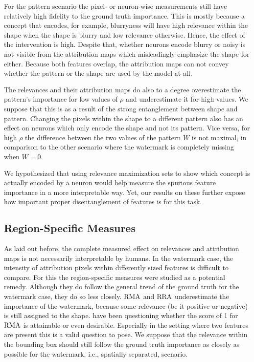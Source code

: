 For the pattern scenario the pixel- or neuron-wise measurements still have relatively high fidelity to the ground truth importance. 
This is mostly because a concept that encodes, for example, blurryness will have high relevance within the shape when the shape is blurry and low relevance otherwise. Hence, the effect of the intervention is high. Despite that, whether neurons encode blurry or noisy is not visible from the attribution maps which misleadingly emphasize the shape for either. Because both features overlap, the attribution maps can not convey whether the pattern or the shape are used by the model at all.

The relevances and their attribution maps do also to a degree overestimate the pattern's importance for low values of $\rho$ and underestimate it for high values. We suppose that this is as a result of the strong entanglement between shape and pattern. Changing the pixels within the shape to a different pattern also has an effect on neurons which only encode the shape and not its pattern. Vice versa, for high $\rho$ the difference between the two values of the pattern $W$ is not maximal, in comparison to the other scenario where the watermark is completely missing when $W=0$. 

We hypothesized that using relevance maximization sets to show which concept is actually encoded by a neuron would help measure the spurious feature importance in a more interpretable way. Yet, our results on these further expose how important proper disentanglement of features is for this task. 

\subsection{Region-Specific Measures}
As laid out before, the complete measured effect on relevances and attribution maps is not necessarily interpretable by humans. In the watermark case, the intensity of attribution pixels within differently sized features is difficult to compare. For this the region-specific measures were studied as a potential remedy. 
Although they do follow the general trend of the ground truth for the watermark case, they do so less closely. 
$\operatorname*{RMA}$ and $\operatorname*{RRA}$ underestimate the importance of the watermark, because some relevance (be it positive or negative) is still assigned to the shape.
\citeauthor{Arras2022} have been questioning whether the score of 1 for $\operatorname*{RMA}$ is attainable or even desirable. Especially in the setting where two features are present this is a valid question to pose. We suppose that the relevance within the bounding box should still follow the ground truth importance as closely as possible for the watermark, i.e., spatially separated, scenario. 

